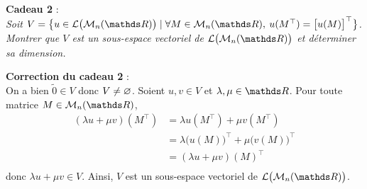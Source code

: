 \documentclass[a4paper]{article}
\begin{document}
	\bigskip
	\bigskip

	\centerline{}

	\bigskip
	\bigskip
	
	\textbf{Cadeau 2} :\\
	\textsl{Soit $V = \big\{u \in \mathcal{L}\big(\mathcal{M}_n(\R)\big)  \mid \forall M \in \mathcal{M}_n(\R),\: u(M^\top) = \big[u(M)\big]^\top\big\}$. Montrer que $V$\/ est un sous-espace vectoriel de $\mathcal{L}\big(\mathcal{M}_n(\R)\big)$\/ et déterminer sa dimension.}

	\bigskip
	\bigskip
	\begin{comment}
		\textbf{Réponse du cadeau 2} :\\
		Soit $M \in \mathcal{M}_n(\R)$. On considère l'application nulle notée $\tilde 0$\/ : $\tilde 0(M^\top) = 0_{\mathcal{M}_n(\R)} = (0_{\mathcal{M}_n(\R)})^\top = [\tilde 0(M)]^\top$. On a donc bien $\tilde 0 \in V$.
		Soient $\lambda,\mu \in \R$, et $u,v \in V$. Soit $M \in \mathcal{M}_n(\R)$. On a $(\lambda u + \mu v)(M^\top) = \lambda u (M^\top) + \mu v(M^\top) = \lambda (u(M))^\top + \mu (v(M))^\top = \big[(\lambda u + \mu v)(M)\big]^\top$, d'où $\lambda u + \mu v \in V$.
		L'ensemble $V$\/ est bien un sous-espace vectoriel de $\mathcal{L}\big(\mathcal{M}_n(\R)\big)$.
		Soit $u \in V$. Les endomorphismes $u$\/ et $\Phi$\/ commutent.
	\end{comment}
	\textbf{Correction du cadeau 2} :\\
	On a bien $\tilde 0 \in V$\/ donc $V \neq \varnothing$.
	Soient $u,v \in V$\/ et $\lambda, \mu \in \R$. Pour toute matrice $M \in \mathcal{M}_n(\R)$,
	\begin{align*}
		(\lambda u + \mu v)(M^\top)
		&= \lambda u(M^\top) + \mu v(M^\top) \\
		&= \lambda \big(u(M)\big)^\top + \mu \big(v(M)\big)^\top \\
		&= (\lambda u + \mu v)(M)^\top  \\
	\end{align*}
	donc $\lambda u + \mu v \in V$. Ainsi, $V$\/ est un sous-espace vectoriel de $\mathcal{L}\big(\mathcal{M}_n(\R)\big)$.
\end{document}
